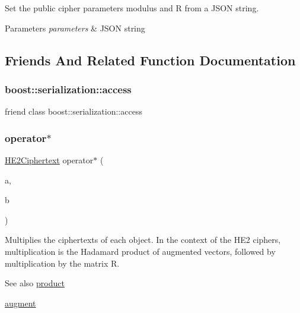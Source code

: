 Set the public cipher parameters {\ttfamily modulus} and {\ttfamily R} from a J\+S\+ON string. 
\begin{DoxyParams}{Parameters}
{\em parameters} & J\+S\+ON string \\
\hline
\end{DoxyParams}


\subsection{Friends And Related Function Documentation}
\mbox{\label{classHE2Ciphertext_ac98d07dd8f7b70e16ccb9a01abf56b9c}} 
\subsubsection{\texorpdfstring{boost\+::serialization\+::access}{boost::serialization::access}}
{\footnotesize\ttfamily friend class boost\+::serialization\+::access\hspace{0.3cm}{\ttfamily [friend]}}

\mbox{\label{classHE2Ciphertext_adfb636b8ce661b0edbd9297cdcf61c88}} 
\subsubsection{\texorpdfstring{operator$\ast$}{operator*}}
{\footnotesize\ttfamily \hyperlink{classHE2Ciphertext}{H\+E2\+Ciphertext} operator$\ast$ (\begin{DoxyParamCaption}\item[{const \hyperlink{classHE2Ciphertext}{H\+E2\+Ciphertext} \&}]{a,  }\item[{const \hyperlink{classHE2Ciphertext}{H\+E2\+Ciphertext} \&}]{b }\end{DoxyParamCaption})\hspace{0.3cm}{\ttfamily [friend]}}

Multiplies the {\ttfamily ciphertexts} of each object. In the context of the H\+E2 ciphers, multiplication is the Hadamard product of augmented vectors, followed by multiplication by the matrix {\ttfamily R}. \begin{DoxySeeAlso}{See also}
\hyperlink{classHE2Ciphertext_a30047cae60f901b106371d70027bf286}{product} 

\hyperlink{classHE2Ciphertext_af8e0dca1959cf2cbd7606d48476c435a}{augment} 
\end{DoxySeeAlso}


